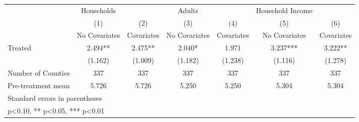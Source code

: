 {
\def\sym#1{\ifmmode^{#1}\else\(^{#1}\)\fi}
\begin{tabular}{l*{6}{c}}
\hline\hline
            &  Households   &               &      Adults   &               &Household Income   &               \\
            &\multicolumn{1}{c}{(1)}&\multicolumn{1}{c}{(2)}&\multicolumn{1}{c}{(3)}&\multicolumn{1}{c}{(4)}&\multicolumn{1}{c}{(5)}&\multicolumn{1}{c}{(6)}\\
            &\multicolumn{1}{c}{No Covariates}&\multicolumn{1}{c}{Covariates}&\multicolumn{1}{c}{No Covariates}&\multicolumn{1}{c}{Covariates}&\multicolumn{1}{c}{No Covariates}&\multicolumn{1}{c}{Covariates}\\
\hline
Treated     &       2.494** &       2.475** &       2.040*  &       1.971   &       3.237***&       3.222** \\
            &     (1.162)   &     (1.009)   &     (1.182)   &     (1.238)   &     (1.116)   &     (1.278)   \\
\hline
Number of Counties&         337   &         337   &         337   &         337   &         337   &         337   \\
Pre-treatment mean&       5.726   &       5.726   &       5.250   &       5.250   &       5.304   &       5.304   \\
\hline\hline
\multicolumn{7}{l}{\footnotesize Standard errors in parentheses}\\
\multicolumn{7}{l}{\footnotesize * p<0.10, ** p<0.05, *** p<0.01}\\
\end{tabular}
}
